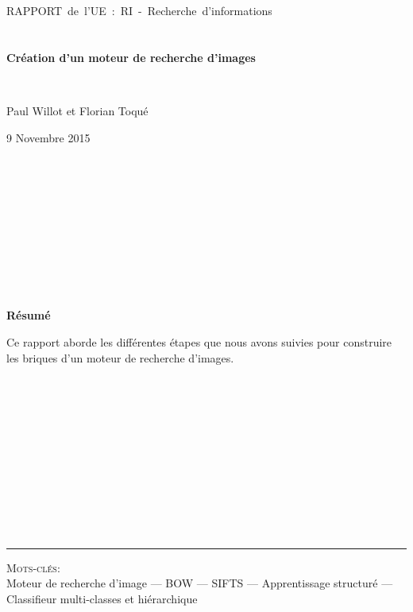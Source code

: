 \documentclass[a4paper,11pt]{report}
\begin{document}
~\\\\\\\\\\
\begin{center}
\mbox{\huge RAPPORT de l'UE : RI - Recherche d'informations}\\~\\ \mbox{ }\\ \textbf{\LARGE Création d'un moteur de recherche d'images}
\end{center}~\\
\begin{center}\large Paul Willot et Florian Toqué\end{center}
\begin{center}\large 9 Novembre 2015 \end{center}~\\\\\\\\\\\\\\\\\
\begin{center}\textbf{\Large{Résumé}}\end{center}
\large{Ce rapport aborde les différentes étapes que nous avons suivies pour construire les briques d'un moteur de recherche d'images.}\\\\\\\\\\\\\\\\\\\\\\\\
\rule{\linewidth}{.5pt}
\textsc{Mots-clés:}\\
Moteur de recherche d'image --- BOW --- SIFTS --- Apprentissage structuré --- Classifieur multi-classes et hiérarchique\\\\\\



\newpage
\tableofcontents
\end{document}
